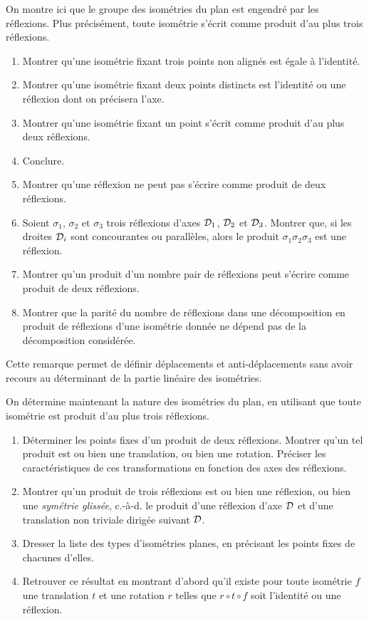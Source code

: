 \documentclass[a4paper,11pt,reqno]{amsart}
\begin{document}
\begin{exo} On montre ici que le groupe des isométries du plan est engendré par les réflexions. Plus précisément, toute isométrie s'écrit comme produit d'au plus trois réflexions.
 \begin{enumerate}
  \item Montrer qu'une isométrie fixant trois points non alignés est égale à l'identité.
  \item Montrer qu'une isométrie fixant deux points distincts est l'identité ou une réflexion dont on précisera l'axe.
  \item Montrer qu'une isométrie fixant un point s'écrit comme produit d'au plus deux réflexions.
  \item Conclure.
  \item Montrer qu'une réflexion ne peut pas s'écrire comme produit de deux réflexions.
  \item Soient $\sigma_1$, $\sigma_2$ et $\sigma_3$ trois réflexions d'axes $\mathcal{D}_1$, $\mathcal{D}_2$ et $\mathcal{D}_3$. Montrer que, si les droites $\mathcal{D}_i$ sont concourantes ou parallèles, alors le produit $\sigma_1 \sigma_2 \sigma_3$ est une réflexion.
  \item Montrer qu'un produit d'un nombre pair de réflexions peut s'écrire comme produit de deux réflexions.
  \item Montrer que la parité du nombre de réflexions dans une décomposition en produit de réflexions d'une isométrie donnée ne dépend pas de la décomposition considérée.
 \end{enumerate}
Cette remarque permet de définir déplacements et anti-déplacements sans avoir recours au déterminant de la partie linéaire des isométries.
\end{exo}

\begin{exo}
On détermine maintenant la nature des isométries du plan, en utilisant que toute isométrie est produit d'au plus trois réflexions.
 \begin{enumerate}
  \item Déterminer les points fixes d'un produit de deux réflexions. Montrer qu'un tel produit est ou bien une translation, ou bien une rotation. Préciser les caractéristiques de ces transformations en fonction des axes des réflexions.
  \item Montrer qu'un produit de trois réflexions est ou bien une réflexion, ou bien une \emph{symétrie glissée}, c.-à-d. le produit d'une réflexion d'axe $\mathcal{D}$ et d'une translation non triviale dirigée suivant $\mathcal{D}$.
  \item Dresser la liste des types d'isométries planes, en précisant les points fixes de chacunes d'elles.
  \item Retrouver ce résultat en montrant d'abord qu'il  existe pour toute isométrie $f$ une translation $t$ et une rotation $r$ telles que $r \circ t \circ f$ soit l'identité ou une réflexion.
 \end{enumerate}

\end{exo}
\end{document}
